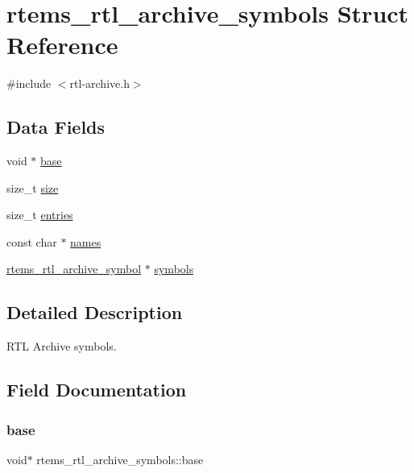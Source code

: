 \hypertarget{structrtems__rtl__archive__symbols}{}\section{rtems\+\_\+rtl\+\_\+archive\+\_\+symbols Struct Reference}
\label{structrtems__rtl__archive__symbols}


{\ttfamily \#include $<$rtl-\/archive.\+h$>$}

\subsection*{Data Fields}
\begin{DoxyCompactItemize}
\item 
void $\ast$ \mbox{\hyperlink{structrtems__rtl__archive__symbols_a81e62c827ff47e8036a46aeba997fed5}{base}}
\item 
size\+\_\+t \mbox{\hyperlink{structrtems__rtl__archive__symbols_a9ef33c571f02fdff86b315f8ee9398f9}{size}}
\item 
size\+\_\+t \mbox{\hyperlink{structrtems__rtl__archive__symbols_a6cc69c08a6ead427731ebb63870ae9d7}{entries}}
\item 
const char $\ast$ \mbox{\hyperlink{structrtems__rtl__archive__symbols_a99325b26679474999306837e96b901fc}{names}}
\item 
\mbox{\hyperlink{structrtems__rtl__archive__symbol}{rtems\+\_\+rtl\+\_\+archive\+\_\+symbol}} $\ast$ \mbox{\hyperlink{structrtems__rtl__archive__symbols_a284ec035b7cfbffdfa03c3b8aa94df5b}{symbols}}
\end{DoxyCompactItemize}


\subsection{Detailed Description}
R\+TL Archive symbols. 

\subsection{Field Documentation}
\mbox{\label{structrtems__rtl__archive__symbols_a81e62c827ff47e8036a46aeba997fed5}} 
\subsubsection{\texorpdfstring{base}{base}}
{\footnotesize\ttfamily void$\ast$ rtems\+\_\+rtl\+\_\+archive\+\_\+symbols\+::base}

